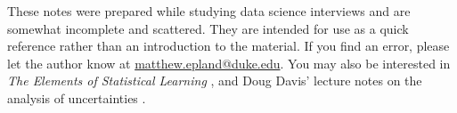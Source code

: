 \preface

These notes were prepared while studying data science interviews and are somewhat incomplete and scattered.
They are intended for use as a quick reference rather than an introduction to the material.
If you find an error, please let the author know at \href{mailto:matthew.epland@duke.edu}{matthew.epland@duke.edu}.
You may also be interested in \textit{The Elements of Statistical Learning} \cite{HastieTF09},
and Doug Davis' lecture notes on the analysis of uncertainties \cite{DougNotes}.
